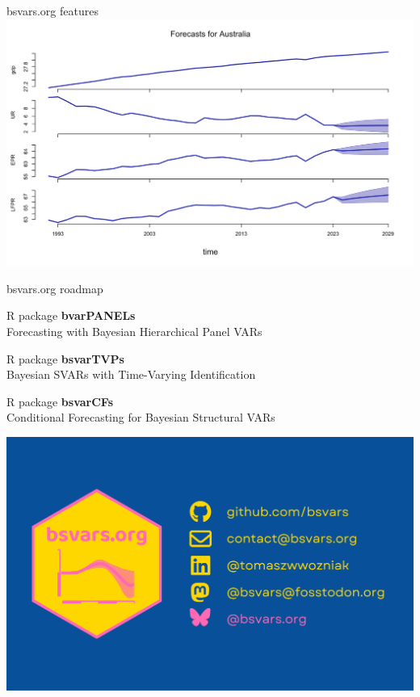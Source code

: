 \documentclass[aspectratio=1610,notes,blackandwhite,mathsans,usenames,dvipsnames]{beamer}
\begin{document}
	
	\begin{frame}{\huge bsvars.org features}
		\centering
		\includegraphics[scale=0.5]{bs_fore}
	\end{frame}

	
	
	\begin{frame}{\huge bsvars.org roadmap}
		\Large
		
		\begin{itemize}[label=$\blacktriangleright$]
		{\color{lig}
			\item R package \textbf{bvarPANELs}\\[0.5ex]
			Forecasting with Bayesian Hierarchical Panel VARs\\[1ex]
			\item R package \textbf{bsvarTVPs} \\[0.5ex]
			Bayesian SVARs with Time-Varying Identification\\[1ex]
			\item R package \textbf{bsvarCFs}\\[0.5ex]
			Conditional Forecasting for Bayesian Structural VARs
		}	
		\end{itemize}
	\end{frame}


	
	
	
	
	
	
	
	
	
		
	{
		\begin{frame}
			\centering
			\includegraphics[scale=0.3]{social}
		\end{frame}
	}
	
\end{document}
